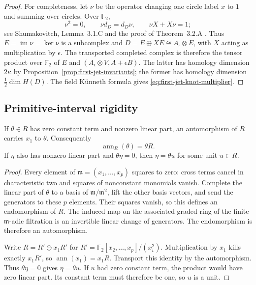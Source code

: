 \begin{proof}
For completeness, let $\nu$ be the operator changing one circle label
$x$ to $1$ and summing over circles. Over $\mathbb F_2$,
\[
 \nu^2=0,\qquad \nu d_D=d_D\nu,\qquad \nu X+X\nu=1;
\]
see Shumakovitch, Lemma~3.1.C and the proof of Theorem~3.2.A
\cite{Shumakovitch2014}. Thus $E=\operatorname{im}\nu=\ker\nu$
is a subcomplex and $D=E\oplus XE\cong A_\epsilon\otimes E$,
with $X$ acting as multiplication by $\epsilon$.
The transported completed complex is therefore the tensor product
over $\mathbb F_2$ of $E$ and $(A_\epsilon\otimes V,A+\epsilon B)$.
The latter has homology dimension $2\kappa$ by
Proposition~\ref{prop:first-jet-invariants}; the former has homology
dimension $\frac12\dim H(D)$.
The field K\"unneth formula gives \eqref{eq:first-jet-knot-multiplier}.
\end{proof}

\subsection{Primitive-interval rigidity}

\begin{lemma}
\label{lem:first-jet-coordinate}
If $\theta\in R$ has zero constant term and nonzero linear part, an
automorphism of $R$ carries $x_1$ to $\theta$. Consequently
\[
 \operatorname{ann}_R(\theta)=\theta R.
\]
If $\eta$ also has nonzero linear part and $\theta\eta=0$, then
$\eta=\theta u$ for some unit $u\in R$.
\end{lemma}

\begin{proof}
Every element of $\mathfrak m=(x_1,\ldots,x_p)$ squares to zero: cross
terms cancel in characteristic two and squares of nonconstant monomials
vanish. Complete the linear part of $\theta$ to a basis of
$\mathfrak m/\mathfrak m^2$, lift the other basis vectors, and send the
generators to these $p$ elements. Their squares vanish, so this defines
an endomorphism of $R$. The induced map on the associated graded ring
of the finite $\mathfrak m$-adic filtration is an invertible linear
change of generators. The endomorphism is therefore an automorphism.

Write $R=R'\oplus x_1R'$ for
$R'=\mathbb F_2[x_2,\ldots,x_p]/(x_i^2)$. Multiplication by $x_1$
kills exactly $x_1R'$, so $\operatorname{ann}(x_1)=x_1R$.
Transport this identity by the automorphism. Thus
$\theta\eta=0$ gives $\eta=\theta u$. If $u$ had zero constant term,
the product would have zero linear part. Its constant term must
therefore be one, so $u$ is a unit.
\end{proof}

